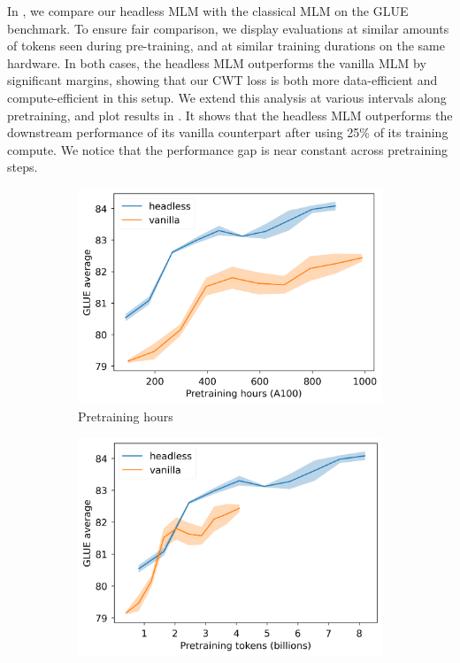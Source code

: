 In , we compare our headless MLM with the classical MLM on the GLUE benchmark. To ensure fair comparison, we display evaluations at similar amounts of tokens seen during pre-training, and at similar training durations on the same hardware. In both cases, the headless MLM outperforms the vanilla MLM by significant margins, showing that our CWT loss is both more data-efficient and compute-efficient in this setup.
%
We extend this analysis at various intervals along pretraining, and plot results in . It shows that the headless MLM outperforms the downstream performance of its vanilla counterpart after using 25\% of its training compute. We notice that the performance gap is near constant across pretraining steps.

\begin{figure}
    \centering
    \begin{subfigure}[b]{0.48\columnwidth}
         \includegraphics[width=\linewidth]{sources/part_2/headless/imgs/bert_compare_hours_p13.png}
         \caption{Pretraining hours}
         \label{fig:bert_compare_hours}
    \end{subfigure}
    \begin{subfigure}[b]{0.48\columnwidth}
         \includegraphics[width=\linewidth]{sources/part_2/headless/imgs/bert_compare_tokens_p13.png}

\end{subfigure}
\end{figure}
